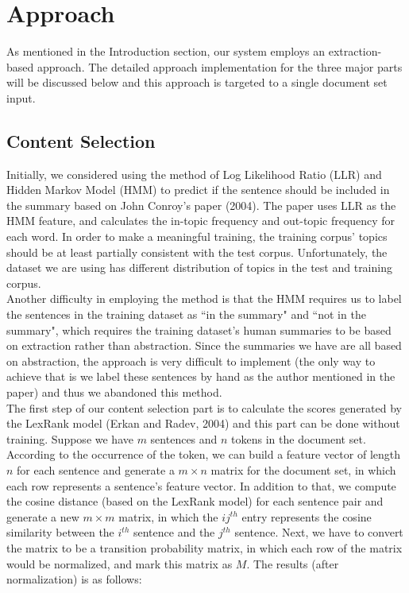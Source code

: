 \documentclass[11pt]{article}
\begin{document}
\section{Approach}

As mentioned in the Introduction section, our system employs an extraction-based approach. The detailed approach implementation for the three major parts will be discussed below and this approach is targeted to a single document set input.

\subsection{Content Selection}

Initially, we considered using the method of Log Likelihood Ratio (LLR) and Hidden Markov Model (HMM) to predict if the sentence should be included in the summary based on John Conroy's paper (2004). The paper uses LLR as the HMM feature, and calculates the in-topic frequency and out-topic frequency for each word. In order to make a meaningful training, the training corpus' topics should be at least partially consistent with the test corpus. Unfortunately, the dataset we are using has different distribution of topics in the test and training corpus. \\
\indent
Another difficulty in employing the method is that the HMM requires us to label the sentences in the training dataset as ``in the summary" and ``not in the summary", which requires the training dataset's human summaries to be based on extraction rather than abstraction. Since the summaries we have are all based on abstraction, the approach is very difficult to implement (the only way to achieve that is we label these sentences by hand as the author mentioned in the paper) and thus we abandoned this method. \\
\indent
The first step of our content selection part is to calculate the scores generated by the LexRank model (Erkan and Radev, 2004) and this part can be done without training. Suppose we have $m$ sentences and $n$ tokens in the document set. According to the occurrence of the token, we can build a feature vector of length $n$ for each sentence and generate a $m\times n$ matrix for the document set, in which each row represents a sentence's feature vector. In addition to that, we compute the cosine distance (based on the LexRank model) for each sentence pair and generate a new $m\times m$ matrix, in which the $ij^{th}$ entry represents the cosine similarity between the $i^{th}$ sentence and the $j^{th}$ sentence. Next, we have to convert the matrix to be a transition probability matrix, in which each row of the matrix would be normalized, and mark this matrix as $M$. The results (after normalization) is as follows:\\
\end{document}
